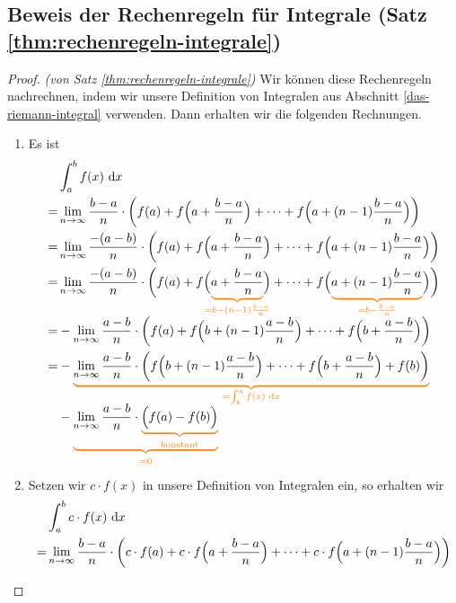 \documentclass[../../main.tex]{subfiles}
\begin{document}
\subsection*{Beweis der Rechenregeln für Integrale (Satz \ref{thm:rechenregeln-integrale})}
\label{das-riemann-integral}
\begin{proof}
    \emph{(von Satz \ref{thm:rechenregeln-integrale})} Wir können diese Rechenregeln nachrechnen, indem wir unsere Definition von Integralen aus Abschnitt 
    \ref{das-riemann-integral} verwenden. Dann erhalten wir die folgenden Rechnungen.
    \begin{enumerate}
        \item Es ist
            \begin{align*}
                &\int_a^bf(x)\diff x\\
                =&\lim_{n\rightarrow\infty}\frac{b-a}{n}\cdot \biggl(f(a)+f\Bigl(a+\frac{b-a}{n}\Bigr)+\dots+f\Bigl(a+(n-1)\frac{b-a}{n}\Bigr)\biggr)\\
                =&\lim_{n\rightarrow\infty}\frac{-(a-b)}{n}\cdot \biggl(f(a)+f\Bigl(a+\frac{b-a}{n}\Bigr)+\dots+f\Bigl(a+(n-1)\frac{b-a}{n}\Bigr)\biggr)\\
                =&\lim_{n\rightarrow\infty}\frac{-(a-b)}{n}\cdot \biggl(f(a)+f\Bigl(\colorbrace{a+\frac{b-a}{n}}{=b-(n-1)\frac{b-a}{n}}\Bigr)
                +\dots+f\Bigl(\colorbrace{a+(n-1)\frac{b-a}{n}}{=b-\frac{b-a}{n}}\Bigr)\biggr)\\
                =&-\lim_{n\rightarrow\infty}\frac{a-b}{n}\cdot \biggl(f(a)+f\Bigl(b+(n-1)\frac{a-b}{n}\Bigr)
                +\dots+f\Bigl(b+\frac{a-b}{n}\Bigr)\biggr)\\
                =&-\colorbrace{\lim_{n\rightarrow\infty}\frac{a-b}{n}\cdot \biggl(f\Bigl(b+(n-1)\frac{a-b}{n}\Bigr)
                +\dots+f\Bigl(b+\frac{a-b}{n}\Bigr)+f(b)\biggr)}{=\int_b^af(x)\diff x}\\
                &-\colorbrace{\lim_{n\rightarrow\infty}\frac{a-b}{n}\cdot \colorbrace{\Bigl(f(a)-f(b)\Bigr)}{\text{konstant}}}{\text{=0}}
            \end{align*}
        \item Setzen wir $c\cdot f(x)$ in unsere Definition von Integralen ein, so erhalten wir
        \begin{align*}
            &\int_a^bc\cdot f(x)\diff x\\
            =&\lim_{n\rightarrow\infty}\frac{b-a}{n}\cdot \biggl(c\cdot f(a)+c\cdot f\Bigl(a+\frac{b-a}{n}\Bigr)+\dots+c\cdot f\Bigl(a+(n-1)\frac{b-a}{n}\Bigr)\biggr)\\

\end{align*}
\end{enumerate}
\end{proof}
\end{document}
